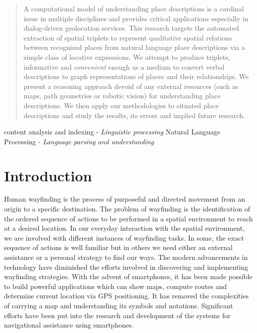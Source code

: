 \documentclass[letter]{sig-alternate}
\begin{document}
\begin{abstract}
  A computational model of understanding place descriptions is a cardinal issue in multiple disciplines and provides critical applications especially in dialog-driven geolocation services. This research targets the automated extraction of spatial triplets to represent qualitative spatial relations between recognized places from natural language place descriptions via a simple class of locative expressions. We attempt to produce triplets, informative and \textit{convenient} enough as a medium to convert verbal descriptions to graph representations of places and their relationships. We present a reasoning approach devoid of any external resources (such as maps, path geometries or robotic vision) for understanding place descriptions. We then apply our methodologies to situated place descriptions and study the results, its errors and implied future research.
\end{abstract}

 content analysis and indexing - \textit{Linguistic processing} 
Natural Language Processing - \textit{Language parsing and understanding}



\section{Introduction}
Human wayfinding is the process of purposeful and directed movement from an origin to a specific destination. The problem of wayfinding is the identification of the ordered sequence of actions to be performed in a spatial environment to reach at a desired location. In our everyday interaction with the spatial environment, we are involved with different instances of wayfinding tasks. In some, the exact sequence of actions is well familiar but in others we need either an external assistance or a personal strategy to find our ways. The modern advancements in technology have diminished the efforts involved in discovering and implementing wayfinding strategies. With the advent of smartphones, it has been made possible to build powerful applications which can show maps, compute routes and determine current location via GPS positioning. It has removed the complexities of carrying a map and understanding its symbols and notations. Significant efforts have been put into the research and development of the systems for navigational assistance using smartphones. 
\end{document}
